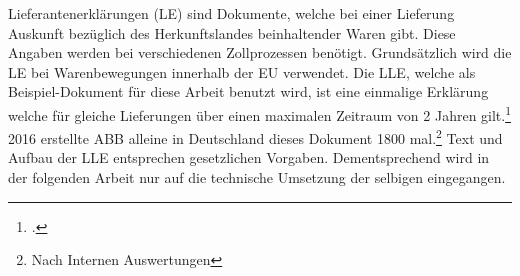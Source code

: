  Lieferantenerklärungen (LE) sind Dokumente, welche bei einer Lieferung Auskunft bezüglich des Herkunftslandes beinhaltender Waren gibt. Diese Angaben werden bei verschiedenen Zollprozessen benötigt. Grundsätzlich wird die \ac{LE} bei Warenbewegungen innerhalb der \ac{EU} verwendet. Die \ac{LLE}, welche als Beispiel-Dokument für diese Arbeit benutzt wird, ist eine einmalige Erklärung welche für gleiche Lieferungen über einen maximalen Zeitraum von 2 Jahren gilt.\footcite{ZOLL.2017} 2016 erstellte ABB alleine in Deutschland dieses Dokument 1800 mal.\footnote{Nach Internen Auswertungen} Text und Aufbau der \ac{LLE} entsprechen gesetzlichen Vorgaben. Dementsprechend wird in der folgenden Arbeit nur auf die technische Umsetzung der selbigen eingegangen.
